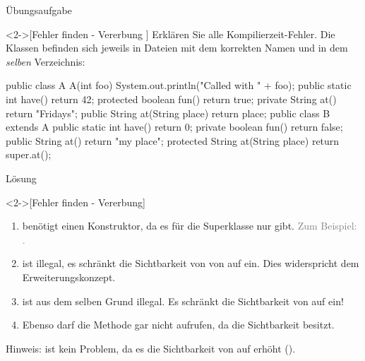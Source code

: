 \ifull
\begin{frame}[c,fragile]{Übungsaufgabe}
    \begin{exercise}<2->[Fehler finden - Vererbung ]
        \pause{}Erklären Sie alle Kompilierzeit-Fehler. Die Klassen befinden sich jeweils in Dateien mit dem korrekten Namen und in dem \emph{selben} Verzeichnis:\pause{}
\begin{plainjava}
public class A {
    A(int foo) { System.out.println("Called with " + foo); }
    public static int have() { return 42; }
    protected boolean fun() { return true; }
    private String at() { return "Fridays"; }
    public String at(String place) { return place; }
}
public class B extends A {
    public static int have() { return 0; }
    private boolean fun() { return false; }
    public String at() { return "my place"; }
    protected String at(String place) { return super.at(); }
}
\end{plainjava}
    \end{exercise}
\end{frame}

\begin{frame}[c,fragile]{Lösung}
    \begin{solve}<2->[Fehler finden - Vererbung]
        \begin{enumerate}[<+(1)->]
            \item {} benötigt einen Konstruktor, da es für die Superklasse nur  gibt.\pause{} \textcolor{gray}{Zum Beispiel: .}
            \item {} ist illegal, es schränkt die Sichtbarkeit von  von  auf  ein. Dies widerspricht dem Erweiterungskonzept.
            \item {} ist aus dem selben Grund illegal. Es schränkt die Sichtbarkeit von  auf  ein!
            \item Ebenso darf  die Methode  gar nicht aufrufen, da  die Sichtbarkeit  besitzt.
        \end{enumerate}
        Hinweis:  ist kein Problem, da es die Sichtbarkeit von  auf  erhöht ().
    \end{solve}
\end{frame}
\fi


